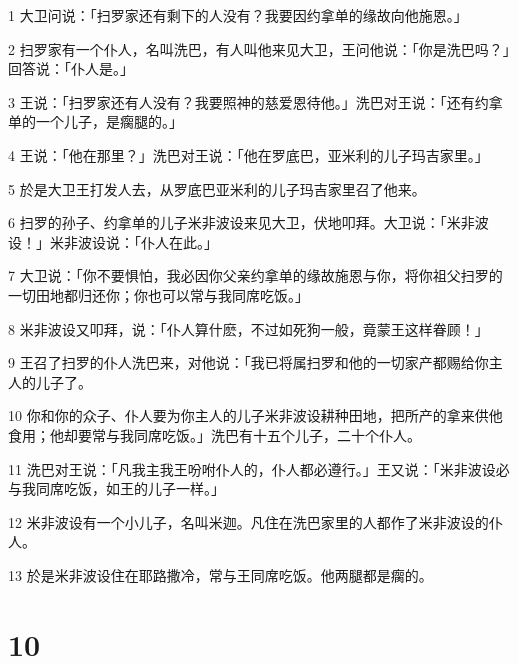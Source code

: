 \par 1 大卫问说：「扫罗家还有剩下的人没有？我要因约拿单的缘故向他施恩。」
\par 2 扫罗家有一个仆人，名叫洗巴，有人叫他来见大卫，王问他说：「你是洗巴吗？」回答说：「仆人是。」
\par 3 王说：「扫罗家还有人没有？我要照神的慈爱恩待他。」洗巴对王说：「还有约拿单的一个儿子，是瘸腿的。」
\par 4 王说：「他在那里？」洗巴对王说：「他在罗底巴，亚米利的儿子玛吉家里。」
\par 5 於是大卫王打发人去，从罗底巴亚米利的儿子玛吉家里召了他来。
\par 6 扫罗的孙子、约拿单的儿子米非波设来见大卫，伏地叩拜。大卫说：「米非波设！」米非波设说：「仆人在此。」
\par 7 大卫说：「你不要惧怕，我必因你父亲约拿单的缘故施恩与你，将你祖父扫罗的一切田地都归还你；你也可以常与我同席吃饭。」
\par 8 米非波设又叩拜，说：「仆人算什麽，不过如死狗一般，竟蒙王这样眷顾！」
\par 9 王召了扫罗的仆人洗巴来，对他说：「我已将属扫罗和他的一切家产都赐给你主人的儿子了。
\par 10 你和你的众子、仆人要为你主人的儿子米非波设耕种田地，把所产的拿来供他食用；他却要常与我同席吃饭。」洗巴有十五个儿子，二十个仆人。
\par 11 洗巴对王说：「凡我主我王吩咐仆人的，仆人都必遵行。」王又说：「米非波设必与我同席吃饭，如王的儿子一样。」
\par 12 米非波设有一个小儿子，名叫米迦。凡住在洗巴家里的人都作了米非波设的仆人。
\par 13 於是米非波设住在耶路撒冷，常与王同席吃饭。他两腿都是瘸的。

\chapter{10}

